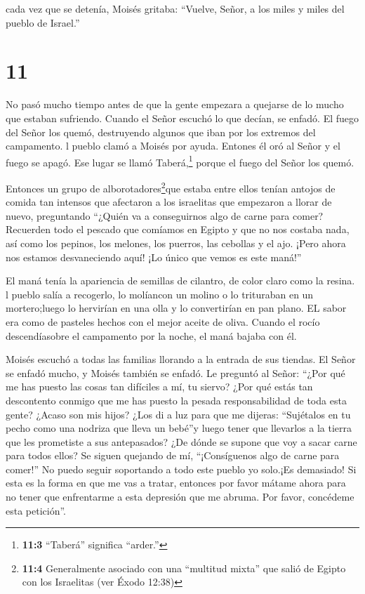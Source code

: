  cada vez que se detenía, Moisés gritaba: ``Vuelve, Señor,
a los miles y miles del pueblo de Israel.''

\hypertarget{section-10}{%
\section{11}\label{section-10}}

 No pasó mucho tiempo antes de que la gente empezara a
quejarse de lo mucho que estaban sufriendo. Cuando el Señor escuchó lo
que decían, se enfadó. El fuego del Señor los quemó, destruyendo algunos
que iban por los extremos del campamento.  l pueblo clamó a
Moisés por ayuda. Entones él oró al Señor y el fuego se apagó.
 Ese lugar se llamó Taberá,\footnote{\textbf{11:3}
  ``Taberá'' significa ``arder.''} porque el fuego del Señor los quemó.

 Entonces un grupo de alborotadores\footnote{\textbf{11:4}
  Generalmente asociado con una ``multitud mixta'' que salió de Egipto
  con los Israelitas (ver Éxodo 12:38)}que estaba entre ellos tenían
antojos de comida tan intensos que afectaron a los israelitas que
empezaron a llorar de nuevo, preguntando ``¿Quién va a conseguirnos algo
de carne para comer?  Recuerden todo el pescado que comíamos
en Egipto y que no nos costaba nada, así como los pepinos, los melones,
los puerros, las cebollas y el ajo.  ¡Pero ahora nos estamos
desvaneciendo aquí! ¡Lo único que vemos es este maná!''

 El maná tenía la apariencia de semillas de cilantro, de
color claro como la resina.  l pueblo salía a recogerlo, lo
molíancon un molino o lo trituraban en un mortero;luego lo hervirían en
una olla y lo convertirían en pan plano. EL sabor era como de pasteles
hechos con el mejor aceite de oliva.  Cuando el rocío
descendíasobre el campamento por la noche, el maná bajaba con él.

 Moisés escuchó a todas las familias llorando a la entrada
de sus tiendas. El Señor se enfadó mucho, y Moisés también se enfadó.
 Le preguntó al Señor: ``¿Por qué me has puesto las cosas
tan difíciles a mí, tu siervo? ¿Por qué estás tan descontento conmigo
que me has puesto la pesada responsabilidad de toda esta gente?
 ¿Acaso son mis hijos? ¿Los di a luz para que me dijeras:
``Sujétalos en tu pecho como una nodriza que lleva un bebé''y luego
tener que llevarlos a la tierra que les prometiste a sus antepasados?
 ¿De dónde se supone que voy a sacar carne para todos
ellos? Se siguen quejando de mí, ``¡Consíguenos algo de carne para
comer!''  No puedo seguir soportando a todo este pueblo yo
solo.¡Es demasiado!  Si esta es la forma en que me vas a
tratar, entonces por favor mátame ahora para no tener que enfrentarme a
esta depresión que me abruma. Por favor, concédeme esta petición''.

